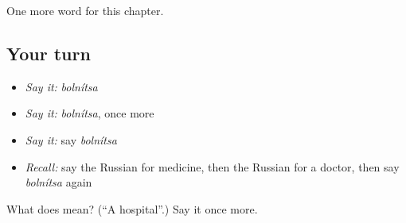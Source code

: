 \begin{grammarlens}[title={What you've built}]
One more word for this chapter.
\end{grammarlens}

\subsection*{Your turn}
\begin{itemize}
\raggedright
  \item \emph{Say it:} \emph{bolnítsa}
  \item \emph{Say it:} \emph{bolnítsa}, once more
  \item \emph{Say it:} say \emph{bolnítsa}
  \item \emph{Recall:} say the Russian for medicine, then the Russian for a doctor, then say \emph{bolnítsa} again
\end{itemize}

\begin{tcolorbox}[breakable,colback=teal!4,colframe=teal!35!black,title={Before you move on}]
What does  mean? (\textquotedblleft{}A hospital\textquotedblright{}.) Say it once more.
\end{tcolorbox}
